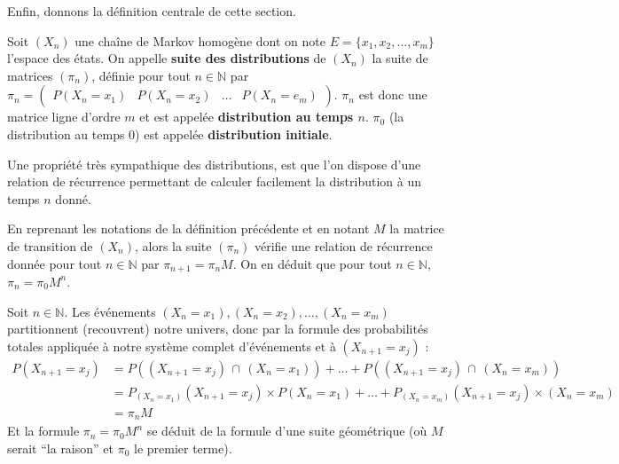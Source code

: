 	Enfin, donnons la définition centrale de cette section.

	\begin{formula}[Définition]
		\contentwidth[big]
		Soit $(X_n)$ une chaîne de Markov homogène dont on note $E = \{x_1, x_2, \dots, x_m\}$ l'espace des états. On appelle \textbf{suite des distributions} de $(X_n)$ la suite de matrices $(\pi_n)$, définie pour tout $n \in \mathbb{N}$ par $\displaystyle{\pi_n = \begin{pmatrix} P(X_n = x_1) & P(X_n = x_2) & \dots & P(X_n = e_m) \end{pmatrix}}$.
		\newpar
		$\pi_n$ est donc une matrice ligne d'ordre $m$ et est appelée \textbf{distribution au temps $n$}.
		\newpar
		$\pi_0$ (la distribution au temps $0$) est appelée \textbf{distribution initiale}.
	\end{formula}

	Une propriété très sympathique des distributions, est que l'on dispose d'une relation de récurrence permettant de calculer facilement la distribution à un temps $n$ donné.

	\begin{formula}
		En reprenant les notations de la définition précédente et en notant $M$ la matrice de transition de $(X_n)$, alors la suite $(\pi_n)$ vérifie une relation de récurrence donnée pour tout $n \in \mathbb{N}$ par $\pi_{n+1} = \pi_n M$.
		\newpar
		On en déduit que pour tout $n \in \mathbb{N}$, $\pi_n = \pi_0 M^n$.
	\end{formula}

	\begin{demonstration}
		\contentwidth[big]
		Soit $n \in \mathbb{N}$. Les événements $(X_n = x_1), (X_n = x_2), \dots, (X_n =x_m)$ partitionnent (recouvrent) notre univers, donc par la formule des probabilités totales appliquée à notre système complet d'événements et à $(X_{n+1} = x_j)$ :
		\begin{align*}
			P(X_{n+1} = x_j) &= P((X_{n+1} = x_j) \, \cap \, (X_n = x_1)) + \dots + P((X_{n+1} = x_j) \, \cap \, (X_n = x_m)) \\
			&= P_{(X_n = x_1)}(X_{n+1} = x_j) \times P(X_n = x_1) + \dots + P_{(X_n = x_m)}(X_{n+1} = x_j) \times (X_n = x_m) \\
			&= \pi_n M
		\end{align*}
		Et la formule $\pi_n = \pi_0 M^n$ se déduit de la formule d'une suite géométrique (où $M$ serait ``la raison'' et $\pi_0$ le premier terme).
	\end{demonstration}

